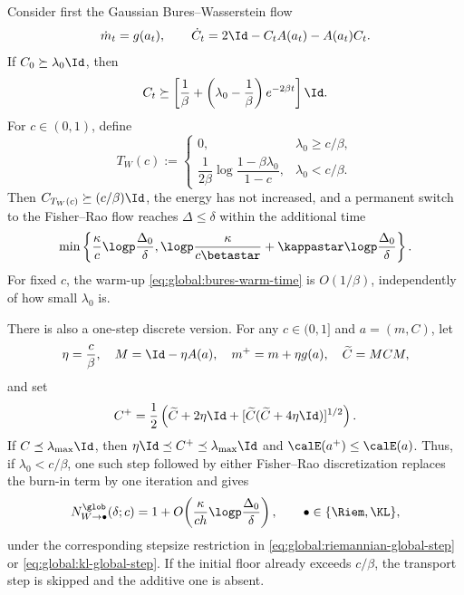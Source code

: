 \begin{proposition}
\label{prop:global:bures-warm-start}
Consider first the Gaussian Bures--Wasserstein flow
\begin{equation}
\label{eq:global:bures-flow}
    \dot m_t=g(a_t),
    \qquad
    \dot C_t=2\Id-C_tA(a_t)-A(a_t)C_t.
\end{equation}
If \(C_0\succeq\lambda_0\Id\), then
\begin{equation}
\label{eq:global:bures-floor}
    C_t\succeq
    \left[
        \frac1\beta+\left(\lambda_0-\frac1\beta\right)e^{-2\beta t}
    \right]\Id.
\end{equation}
For \(c\in(0,1)\), define
\begin{equation}
\label{eq:global:bures-warm-time}
    T_W(c):=
    \begin{cases}
        0, & \lambda_0\geq c/\beta,\\[3pt]
        \dfrac1{2\beta}
        \log\dfrac{1-\beta\lambda_0}{1-c},
        & \lambda_0<c/\beta.
    \end{cases}
\end{equation}
Then \(C_{T_W(c)}\succeq(c/\beta)\Id\), the energy has not increased, and a permanent switch to
the Fisher--Rao flow reaches \(\Delta\leq\delta\) within the additional time
\begin{equation}
\label{eq:global:bures-to-fr-continuous}
    \min\left\{
        \frac\kappa c\logp\frac{\Delta_0}{\delta},
        \logp\frac\kappa{c\betastar}
        +\kappastar\logp\frac{\Delta_0}{\delta}
    \right\}.
\end{equation}
For fixed \(c\), the warm-up \eqref{eq:global:bures-warm-time} is \(O(1/\beta)\), independently of
how small \(\lambda_0\) is.

There is also a one-step discrete version.  For any \(c\in(0,1]\) and \(a=(m,C)\), let
\begin{equation}
\label{eq:global:bures-forward-backward}
    \eta=\frac c\beta,
    \quad
    M=\Id-\eta A(a),
    \quad
    m^+=m+\eta g(a),
    \quad
    \widetilde C=MCM,
\end{equation}
and set
\begin{equation}
\label{eq:global:bures-forward-backward-covariance}
    C^+
    =\frac12\left(
        \widetilde C+2\eta\Id
        +[\widetilde C(\widetilde C+4\eta\Id)]^{1/2}
      \right).
\end{equation}
If \(C\preceq\lambda_{\max}\Id\), then
\(\eta\Id\preceq C^+\preceq\lambda_{\max}\Id\) and
\(\calE(a^+)\leq\calE(a)\).  Thus, if \(\lambda_0<c/\beta\), one such step followed by either
Fisher--Rao discretization replaces the burn-in term by one iteration and gives
\begin{equation}
\label{eq:global:bures-to-fr-discrete}
    N_{W\to\bullet}^{\glob}(\delta;c)
    =1+O\!\left(
        \frac\kappa{ch}\logp\frac{\Delta_0}{\delta}
    \right),
    \qquad \bullet\in\{\Riem,\KL\},
\end{equation}
under the corresponding stepsize restriction in
\eqref{eq:global:riemannian-global-step} or \eqref{eq:global:kl-global-step}.  If the initial floor
already exceeds \(c/\beta\), the transport step is skipped and the additive one is absent.
\end{proposition}

